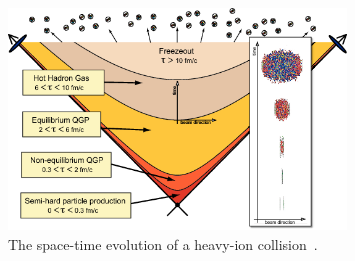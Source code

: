 \begin{figure}[h!]
\centering
 \includegraphics[width=0.8\textwidth] {FigCap1/timescales.png}
\caption{The space-time evolution of a heavy-ion collision~\cite{Strickland:2014pga}. }
\label{fig:timescales}
\end{figure}


